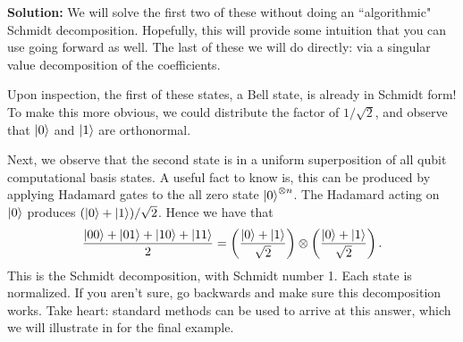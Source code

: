 \documentclass{book}
\begin{document}
    \textbf{Solution:} We will solve the first two of these without doing an ``algorithmic" Schmidt decomposition. Hopefully, this will provide some intuition that you can use going forward as well. The last of these we will do directly: via a singular value decomposition of the coefficients. 
    
    Upon inspection, the first of these states, a Bell state, is already in Schmidt form! To make this more obvious, we could distribute the factor of $1/\sqrt{2}$, and observe that $\ket{0}$ and $\ket{1}$ are orthonormal. 

    Next, we observe that the second state is in a uniform superposition of all qubit computational basis states. A useful fact to know is, this can be produced by applying Hadamard gates to the all zero state $\ket{0}^{\otimes n}$. The Hadamard acting on $\ket{0}$ produces $(\ket{0} + \ket{1})/\sqrt{2}$. Hence we have that 
    \begin{align}
        \frac{\ket{00} + \ket{01} + \ket{10} + \ket{11}}{2} = \left(\frac{\ket{0}+\ket{1}}{\sqrt{2}}\right)\otimes \left(\frac{\ket{0}+\ket{1}}{\sqrt{2}}\right).
    \end{align}
    This is the Schmidt decomposition, with Schmidt number 1. Each state is normalized. If you aren't sure, go backwards and make sure this decomposition works. Take heart: standard methods can be used to arrive at this answer, which we will illustrate in for the final example. 
\end{document}
